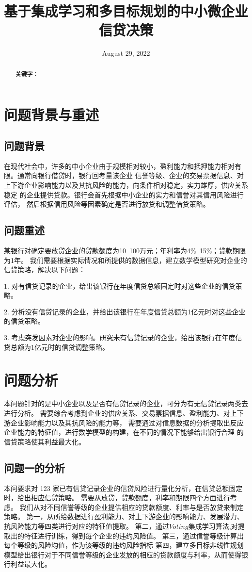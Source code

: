 \documentclass[UTF8]{ctexart}
\title{基于集成学习和多目标规划的中小微企业信贷决策}
\date{August 29, 2022}
\begin{document}
\maketitle{}
\renewcommand{\abstractname}{\Large 摘要\\}
\begin{abstract}
	\normalsize
	

	\textbf{关键字}：

\end{abstract}


\section{问题背景与重述}
\subsection{问题背景}
在现代社会中，许多的中小企业由于规模相对较小，盈利能力和抵押能力相对有限。通常向银行借贷时，银行回考量该企业
信誉等级、企业的交易票据信息、对上下游企业影响能力以及其抗风险的能力，向条件相对稳定，实力雄厚，供应关系稳定
的企业提供贷款。银行会首先根据中小企业的实力和信誉对其信用风险进行评估，
然后根据信用风险等因素确定是否进行放贷和调整借贷策略。

\subsection{问题重述}
某银行对确定要放贷企业的贷款额度为10~100万元；年利率为4$\%$~15$\%$；贷款期限为1年。
我们需要根据实际情况和所提供的数据信息，建立数学模型研究对企业的信贷策略，解决以下问题：

1. 对有信贷记录的企业，给出该银行在年度信贷总额固定时对这些企业的信贷策略。

2. 分析没有信贷记录的企业，并给出该银行在年度信贷总额为1亿元时对这些企业的信贷策略。

3. 考虑突发因素对企业的影响。研究未有信贷记录的企业，给出该银行在年度信贷总额为1亿元时的信贷调整策略。


\section{问题分析}
本问题针对的是中小企业以及是否有信贷记录的企业，可分为有无信贷记录两类去进行分析。
需要综合考虑到企业的供应关系、交易票据信息、盈利能力、对上下游企业影响能力以及其抗风险的能力等，
需要通过对信息数据的分析提取出反应企业能力的特征值，进行数学模型的构建，在不同的情况下能够给出银行合理
的信贷策略使其利益最大化。
\subsection{问题一的分析}
本问要求对 123 家已有信贷记录企业的信贷风险进行量化分析，在信贷总额固定时，给出相应信贷策略。
需要从放贷，贷款额度，利率和期限四个方面进行考虑。
我们从对不同信誉等级的企业提供相应的贷款额度、利率与是否放贷来制定策略。
第一，从所给数据进行盈利能力、对上下游企业的影响能力、发展潜力、抗风险能力等四类进行对应的特征值提取。
第二，通过$Voting$集成学习算法,对提取出的特征进行训练，得到每个企业的违约风险值。
第三，通过信誉等级计算出每个等级的风险均值，作为该等级的违约风险指标
第四，建立多目标非线性规划模型给出银行对于不同信誉等级的企业发放的相应的贷款额度与利率，从而使得银行利益最大化。
\end{document}
